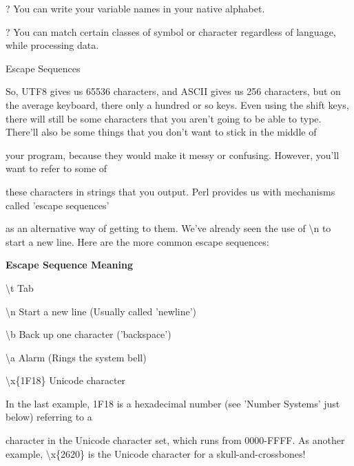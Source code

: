 \documentclass[a4paper,11pt]{book}
\begin{document}
\noindent ? You can write your variable names in your native alphabet.

\noindent 

\noindent ? You can match certain classes of symbol or character regardless of language, while processing data.

\noindent 

\noindent 

\noindent Escape Sequences

\noindent 

\noindent So, UTF8 gives us 65536 characters, and ASCII gives us 256 characters, but on the average keyboard, there only a hundred or so keys. Even using the shift keys, there will still be some characters that you aren't going to be able to type. There'll also be some things that you don't want to stick in the middle of

\noindent your program, because they would make it messy or confusing. However, you'll want to refer to some of

\noindent these characters in strings that you output. Perl provides us with mechanisms called 'escape sequences'

\noindent as an alternative way of getting to them. We've already seen the use of \textbackslash n to start a new line. Here are the more common escape sequences:

\noindent 

\noindent 

\noindent \textbf{Escape Sequence Meaning}

\noindent 

\noindent \textbackslash t Tab

\noindent 

\noindent \textbackslash n Start a new line (Usually called 'newline')

\noindent 

\noindent \textbackslash b Back up one character ('backspace')

\noindent 

\noindent \textbackslash a Alarm (Rings the system bell)

\noindent 

\noindent \textbackslash x\{1F18\} Unicode character

\noindent 

\noindent 

\noindent In the last example, 1F18 is a hexadecimal number (see 'Number Systems' just below) referring to a

\noindent character in the Unicode character set, which runs from 0000-FFFF. As another example, \textbackslash x\{2620\} is the Unicode character for a skull-and-crossbones!
\end{document}
